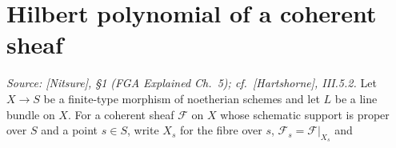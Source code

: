 
\section{Hilbert polynomial of a coherent sheaf}
\label{sec:hilbert_polynomial}

\begin{definition}
  \label{def:hilbert_polynomial}
  \textit{Source: [Nitsure], \S 1 (FGA Explained Ch.~5); cf.\ [Hartshorne],
  III.5.2.}
  Let \(X \to S\) be a finite-type morphism of noetherian schemes and let \(L\)
  be a line bundle on \(X\). For a coherent sheaf \(\mathcal{F}\) on \(X\) whose
  schematic support is proper over \(S\) and a point \(s \in S\), write \(X_s\)
  for the fibre over \(s\), \(\mathcal{F}_s = \mathcal{F}|_{X_s}\) and

\end{definition}
